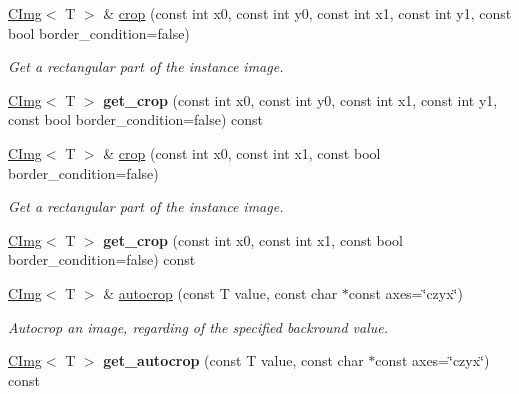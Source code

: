 \begin{DoxyCompactItemize}
\item 
\hyperlink{structcimg__library_1_1CImg}{CImg}$<$ T $>$ \& \hyperlink{structcimg__library_1_1CImg_a54ad48809ef0be41797c7703e3b4133d}{crop} (const int x0, const int y0, const int x1, const int y1, const bool border\_\-condition=false)
\begin{DoxyCompactList}\small\item\em Get a rectangular part of the instance image. \item\end{DoxyCompactList}\item 
\hypertarget{structcimg__library_1_1CImg_aa610bf091842bba7d0ea8730f9450c2e}{
\hyperlink{structcimg__library_1_1CImg}{CImg}$<$ T $>$ {\bfseries get\_\-crop} (const int x0, const int y0, const int x1, const int y1, const bool border\_\-condition=false) const }
\label{structcimg__library_1_1CImg_aa610bf091842bba7d0ea8730f9450c2e}

\item 
\hyperlink{structcimg__library_1_1CImg}{CImg}$<$ T $>$ \& \hyperlink{structcimg__library_1_1CImg_a93a1ecf2944920d55757323e6de2b7da}{crop} (const int x0, const int x1, const bool border\_\-condition=false)
\begin{DoxyCompactList}\small\item\em Get a rectangular part of the instance image. \item\end{DoxyCompactList}\item 
\hypertarget{structcimg__library_1_1CImg_a164e362ebbb5bb59bb2bd70856f30d2d}{
\hyperlink{structcimg__library_1_1CImg}{CImg}$<$ T $>$ {\bfseries get\_\-crop} (const int x0, const int x1, const bool border\_\-condition=false) const }
\label{structcimg__library_1_1CImg_a164e362ebbb5bb59bb2bd70856f30d2d}

\item 
\hypertarget{structcimg__library_1_1CImg_a4591e260f9fa28c496a917524220f1cf}{
\hyperlink{structcimg__library_1_1CImg}{CImg}$<$ T $>$ \& \hyperlink{structcimg__library_1_1CImg_a4591e260f9fa28c496a917524220f1cf}{autocrop} (const T value, const char $\ast$const axes=\char`\"{}czyx\char`\"{})}
\label{structcimg__library_1_1CImg_a4591e260f9fa28c496a917524220f1cf}

\begin{DoxyCompactList}\small\item\em Autocrop an image, regarding of the specified backround value. \item\end{DoxyCompactList}\item 
\hypertarget{structcimg__library_1_1CImg_a1038c4cba1b2ac0c463344f14fc34498}{
\hyperlink{structcimg__library_1_1CImg}{CImg}$<$ T $>$ {\bfseries get\_\-autocrop} (const T value, const char $\ast$const axes=\char`\"{}czyx\char`\"{}) const }
\label{structcimg__library_1_1CImg_a1038c4cba1b2ac0c463344f14fc34498}


\end{DoxyCompactItemize}
